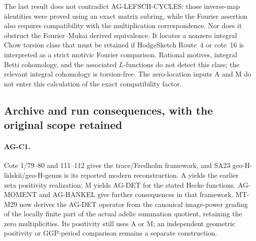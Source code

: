 The last result does not contradict AG-LEFSCH-CYCLES:
those inverse-map identities were proved using an exact
matrix subring, while the Fourier assertion also requires
compatibility with the multiplication correspondence.
Nor does it obstruct the Fourier--Mukai derived equivalence.
It locates a nonzero integral Chow torsion class that must
be retained if HodgeSketch Route~4 or cote~16 is interpreted
as a strict motivic Fourier comparison.  Rational motives,
integral Betti cohomology, and the associated $L$-functions
do not detect this class; the relevant integral cohomology
is torsion-free.  The zero-location inputs A and M do not
enter this calculation of the exact compatibility factor.

\subsection{Archive and run consequences, with the original scope retained}
\label{ag:archive}

\paragraph{AG-C1.} Cote 1/79--80 and 111--112 gives the trace/Fredholm
framework, and SA23 geo-H-lidskii/geo-H-genus is its reported modern
reconstruction. A yields the earlier zeta positivity realization;
M yields AG-DET for the stated Hecke functions. AG-MOMENT and AG-HANKEL
give further consequences in that framework. MT-M29 now derives the
AG-DET operator from the canonical image-power grading of the locally
finite part of the actual adelic summation quotient, retaining the
zero multiplicities. Its positivity still uses A or M; an independent
geometric positivity or GGP-period comparison remains a separate
construction.

